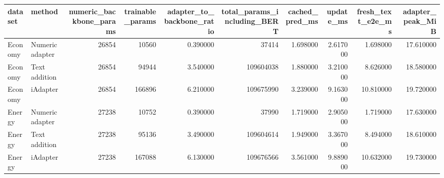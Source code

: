 \begin{tabular}{llrrrrrrrr}
\toprule
dataset & method & numeric\_backbone\_params & trainable\_params & adapter\_to\_backbone\_ratio & total\_params\_including\_BERT & cached\_pred\_ms & update\_ms & fresh\_text\_e2e\_ms & adapter\_peak\_MiB \\
\midrule
Economy & Numeric adapter & 26854 & 10560 & 0.390000 & 37414 & 1.698000 & 2.617000 & 1.698000 & 17.610000 \\
Economy & Text addition & 26854 & 94944 & 3.540000 & 109604038 & 1.880000 & 3.210000 & 8.626000 & 18.580000 \\
Economy & iAdapter & 26854 & 166896 & 6.210000 & 109675990 & 3.239000 & 9.163000 & 10.810000 & 19.720000 \\
Energy & Numeric adapter & 27238 & 10752 & 0.390000 & 37990 & 1.719000 & 2.905000 & 1.719000 & 17.630000 \\
Energy & Text addition & 27238 & 95136 & 3.490000 & 109604614 & 1.949000 & 3.367000 & 8.494000 & 18.610000 \\
Energy & iAdapter & 27238 & 167088 & 6.130000 & 109676566 & 3.561000 & 9.889000 & 10.632000 & 19.730000 \\
\bottomrule
\end{tabular}
